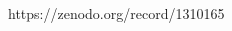 \documentclass[a4,german]{article}
\begin{document}

\begin{thebibliography}{99}
	
https://zenodo.org/record/1310165
\end{thebibliography}
\end{document}
